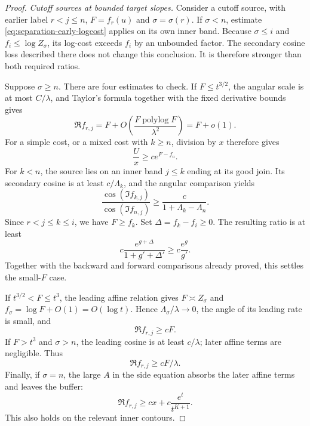 \begin{proof}
\emph{Cutoff sources at bounded target slopes.}
Consider a cutoff source, with earlier label $r<j\leq n$,
$F=f_r(u)$ and $\sigma=\sigma(r)$.  If $\sigma<n$, estimate
\eqref{eq:separation-early-logcost} applies on its own inner
band.  Because $\sigma\leq i$ and
$f_i\leq\log Z_\sigma$, its log-cost exceeds $f_i$ by an
unbounded factor.  The secondary cosine loss described there
does not change this conclusion.  It is therefore stronger
than both required ratios.

Suppose $\sigma\geq n$.  There are four estimates to check.
If $F\leq t^{3/2}$, the angular scale is at most
$C/\lambda$, and Taylor's formula together with the fixed
derivative bounds gives
\[
 \Re f_{r,j}=F+O\!\left(
              \frac{F\operatorname{polylog}F}{\lambda^2}
                         \right)=F+o(1).
\]
For a simple cost, or a mixed cost with $k\geq n$, division
by $x$ therefore gives
\begin{equation}\label{eq:separation-small-F}
 \frac{U}{x}\geq c e^{F-f_n}.
\end{equation}
For $k<n$, the source lies on an inner band $j\leq k$ ending
at its good join.  Its secondary cosine is at least
$c/\Lambda_k$, and the angular comparison yields
\begin{equation}\label{eq:separation-cosine-ratio}
 \frac{\cos(\Im f_{k,j})}{\cos(\Im f_{n,j})}
       \geq\frac{c}{1+\Lambda_k-\Lambda_n}.
\end{equation}
Since $r<j\leq k\leq i$, we have $F\geq f_k$.
Set $\Delta=f_k-f_i\geq0$.  The resulting ratio is at least
\[
 c\frac{e^{g+\Delta}}{1+g'+\Delta'}
       \geq c\frac{e^g}{g'}.
\]
Together with the backward and forward comparisons already
proved, this settles the small-$F$ case.

If $t^{3/2}<F\leq t^3$, the leading affine relation gives
$F\asymp Z_\sigma$ and
$f_\sigma=\log F+O(1)=O(\log t)$.  Hence
$\Lambda_\sigma/\lambda\to0$, the angle of its leading rate
is small, and
\begin{equation}\label{eq:separation-middle-F}
 \Re f_{r,j}\geq cF.
\end{equation}
If $F>t^3$ and $\sigma>n$, the leading cosine is at least
$c/\lambda$; later affine terms are negligible.  Thus
\begin{equation}\label{eq:separation-large-F}
 \Re f_{r,j}\geq cF/\lambda.
\end{equation}
Finally, if $\sigma=n$, the large $A$ in the side equation
absorbs the later affine terms and leaves the buffer:
\begin{equation}\label{eq:separation-sigma-n}
 \Re f_{r,j}\geq cx+
                    c\frac{e^t}{t^{K+1}}.
\end{equation}
This also holds on the relevant inner contours.


\end{proof}
